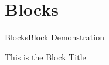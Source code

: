 \section{Blocks}


\begin{frame}[c]{Blocks}{Block Demonstration}
    \begin{block}{This is the Block Title}
        \lipsum[1]%
    \end{block}
    
\end{frame}
